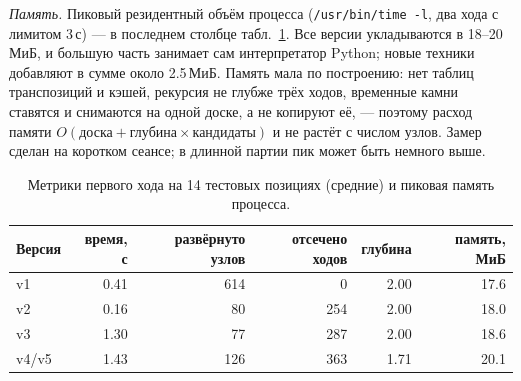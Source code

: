 \documentclass[a4paper,10pt,twocolumn]{article}
\newcommand{\code}[1]{\texttt{#1}}
\begin{document}
\emph{Память.} Пиковый резидентный объём процесса (\code{/usr/bin/time -l}, два хода с лимитом 3\,с) --- в последнем столбце табл.~\ref{tab:metrics}. Все версии укладываются в 18--20\,МиБ, и большую часть занимает сам интерпретатор Python; новые техники добавляют в сумме около 2.5\,МиБ. Память мала по построению: нет таблиц транспозиций и кэшей, рекурсия не глубже трёх ходов, временные камни ставятся и снимаются на одной доске, а не копируют её, --- поэтому расход памяти $O(\text{доска}+\text{глубина}\times\text{кандидаты})$ и не растёт с числом узлов. Замер сделан на коротком сеансе; в длинной партии пик может быть немного выше.

\begin{table}[t]
\centering
\caption{Метрики первого хода на 14 тестовых позициях (средние) и пиковая память процесса.}
\label{tab:metrics}
\begin{tabular}{@{}lrrrrr@{}}
\toprule
Версия & время, с & развёрнуто узлов & отсечено ходов & глубина & память, МиБ \\
\midrule
v1 & 0.41 & 614 & 0 & 2.00 & 17.6 \\
v2 & 0.16 & 80 & 254 & 2.00 & 18.0 \\
v3 & 1.30 & 77 & 287 & 2.00 & 18.6 \\
v4/v5 & 1.43 & 126 & 363 & 1.71 & 20.1 \\
\bottomrule
\end{tabular}
\end{table}
\end{document}
